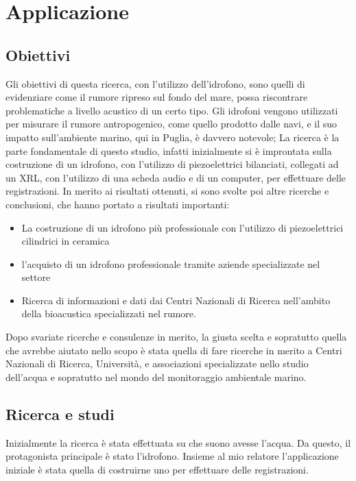 
\chapter{Applicazione}

\section{Obiettivi}
Gli obiettivi di questa ricerca, con l’utilizzo dell’idrofono, sono quelli di evidenziare come il rumore ripreso sul fondo del mare, possa riscontrare problematiche a livello acustico di un certo tipo.
Gli idrofoni vengono utilizzati per misurare il rumore antropogenico, come quello prodotto dalle navi, e il suo impatto sull'ambiente marino, qui in Puglia, è davvero notevole;
La ricerca è la parte fondamentale di questo studio, infatti inizialmente si è improntata sulla costruzione di un idrofono, con l'utilizzo di piezoelettrici bilanciati, collegati ad un XRL, con l'utilizzo di una scheda audio e di un computer, per effettuare delle registrazioni. 
In merito ai risultati ottenuti, si sono svolte poi altre ricerche e conclusioni, che hanno portato a risultati importanti: 

\begin{itemize}
\item La costruzione di un idrofono più professionale con l'utilizzo di piezoelettrici cilindrici in ceramica
\item l'acquisto di un idrofono professionale tramite aziende specializzate nel settore
\item Ricerca di informazioni e dati dai Centri Nazionali di Ricerca nell'ambito della bioacustica specializzati nel rumore. 
\end{itemize}

Dopo svariate ricerche e consulenze in merito, la giusta scelta e sopratutto quella che avrebbe aiutato nello scopo è stata quella di fare ricerche in merito a Centri Nazionali di Ricerca, Università, e associazioni specializzate nello studio dell'acqua e sopratutto nel mondo del monitoraggio ambientale marino. 

\section{Ricerca e studi}
Inizialmente la ricerca è stata effettuata su che suono avesse l'acqua. Da questo, il protagonista principale è stato l'idrofono. 
Insieme al mio relatore l'applicazione iniziale è stata quella di costruirne uno per effettuare delle registrazioni.

